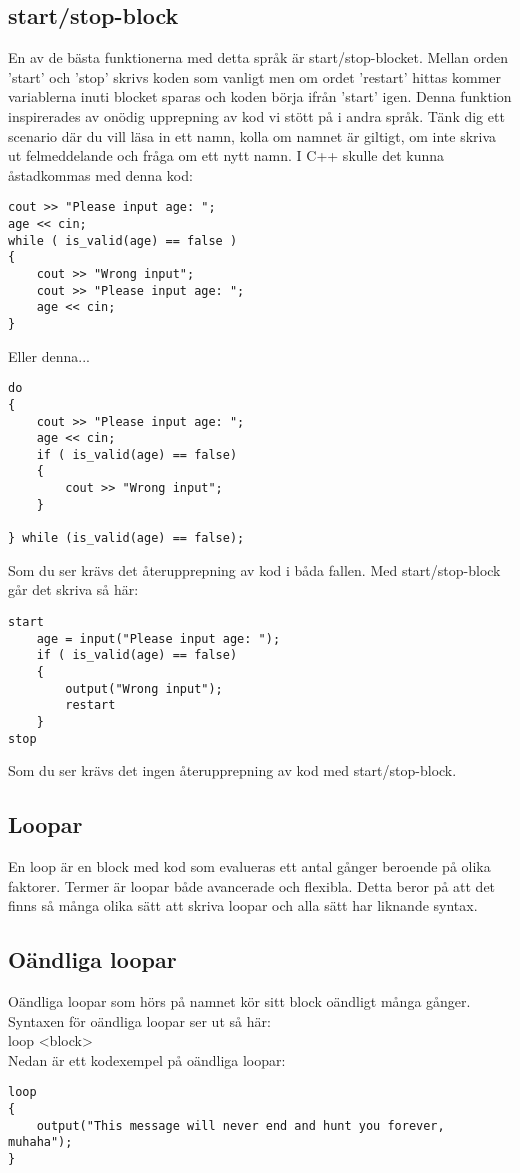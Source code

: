 \documentclass{TDP003mall}
\begin{document}
\subsection{start/stop-block}
En av de bästa funktionerna med detta språk är start/stop-blocket. Mellan orden 'start' och 'stop' skrivs koden som vanligt men om ordet 'restart' hittas kommer variablerna inuti blocket sparas och koden börja ifrån 'start' igen. Denna funktion inspirerades av onödig upprepning av kod vi stött på i andra språk. Tänk dig ett scenario där du vill läsa in ett namn, kolla om namnet är giltigt, om inte skriva ut felmeddelande och fråga om ett nytt namn. I C++ skulle det kunna åstadkommas med denna kod:
\begin{lstlisting}
cout >> "Please input age: ";
age << cin;
while ( is_valid(age) == false )
{
	cout >> "Wrong input";
	cout >> "Please input age: ";
	age << cin;
}
\end{lstlisting}
Eller denna...
\begin{lstlisting}
do
{
	cout >> "Please input age: ";
	age << cin;
	if ( is_valid(age) == false)
	{
		cout >> "Wrong input";
	}

} while (is_valid(age) == false);
\end{lstlisting}
Som du ser krävs det återupprepning av kod i båda fallen. Med start/stop-block går det skriva så här:
\begin{lstlisting}
start
	age = input("Please input age: ");
	if ( is_valid(age) == false)
	{
		output("Wrong input");
		restart
	}
stop
\end{lstlisting}
Som du ser krävs det ingen återupprepning av kod med start/stop-block.

\subsection{Loopar}
En loop är en block med kod som evalueras ett antal gånger beroende på olika faktorer. Termer är loopar både avancerade och flexibla. Detta beror på att det finns så många olika sätt att skriva loopar och alla sätt har liknande syntax. 
\subsection{Oändliga loopar}
Oändliga loopar som hörs på namnet kör sitt block oändligt många gånger.
\\
Syntaxen för oändliga loopar ser ut så här:
\\
loop <block>
\\
Nedan är ett kodexempel på oändliga loopar:
\begin{lstlisting}
loop
{
	output("This message will never end and hunt you forever, muhaha");
}
\end{lstlisting}
\end{document}
